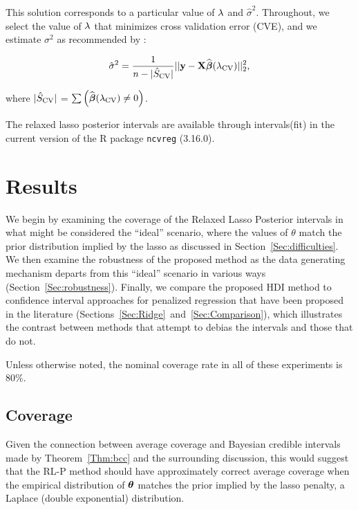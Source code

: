 This solution corresponds to a particular value of $\lambda$ and $\hat{\sigma}^2$. Throughout, we select the value of $\lambda$ that minimizes cross validation error (CVE), and we estimate $\sigma^2$ as recommended by \citep{Reid2016}:

$$
\hat{\sigma}^2 = \frac{1}{n - |\hat{S}_{\textrm{CV}}|} ||\mathbf{y} - \mathbf{X}\widehat{\boldsymbol{\beta}}({\lambda_{\textrm{CV}}})||_2^2,
$$

\noindent where $|\hat{S}_{\textrm{CV}}|$ = $\sum \left( \widehat{\boldsymbol{\beta}}({\lambda_{\textrm{CV}}}) \neq 0 \right)$.

The relaxed lasso posterior intervals are available through intervals(fit) in the current version of the R package \texttt{ncvreg} (3.16.0).

\section{Results}
\label{Sec:results}

We begin by examining the coverage of the Relaxed Lasso Posterior intervals in what might be considered the ``ideal'' scenario, where the values of $\theta$ match the prior distribution implied by the lasso as discussed in Section~\ref{Sec:difficulties}. We then examine the robustness of the proposed method as the data generating mechanism departs from this ``ideal'' scenario in various ways (Section~\ref{Sec:robustness}). Finally, we compare the proposed HDI method to confidence interval approaches for penalized regression that have been proposed in the literature (Sections~\ref{Sec:Ridge}~and~\ref{Sec:Comparison}), which illustrates the contrast between methods that attempt to debias the intervals and those that do not.

Unless otherwise noted, the nominal coverage rate in all of these experiments is 80\%.

\subsection{Coverage}\label{Sec:coverage}

Given the connection between average coverage and Bayesian credible intervals made by Theorem~\ref{Thm:bcc} and the surrounding discussion, this would suggest that the RL-P method should have approximately correct average coverage when the empirical distribution of $\boldsymbol{\theta}$ matches the prior implied by the lasso penalty, a Laplace (double exponential) distribution.

